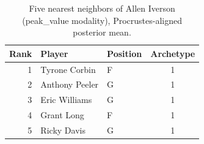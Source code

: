 \begin{table}[htbp]
  \centering\small
  \begin{tabular}{rllc}
    \toprule
    Rank & Player & Position & Archetype \\
    \midrule
    1 & Tyrone Corbin & F & 1 \\
    2 & Anthony Peeler & G & 1 \\
    3 & Eric Williams & G & 1 \\
    4 & Grant Long & F & 1 \\
    5 & Ricky Davis & G & 1 \\
    \bottomrule
  \end{tabular}
  \caption{Five nearest neighbors of Allen Iverson (peak_value modality), Procrustes-aligned posterior mean.}
  \label{tab:Allen_Iverson_neighbors_peak_value}
\end{table}

